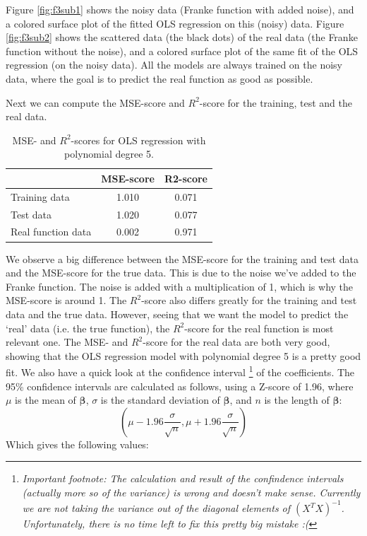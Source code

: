 \documentclass[12pt]{extarticle}
\begin{document}
Figure \ref{fig:f3sub1} shows the noisy data (Franke function with added noise), and a colored surface plot of the fitted OLS regression on this (noisy) data. Figure \ref{fig:f3sub2} shows the scattered data (the black dots) of the real data (the Franke function without the noise), and a colored surface plot of the same fit of the OLS regression (on the noisy data). All the models are always trained on the noisy data, where the goal is to predict the real function as good as possible.

Next we can compute the MSE-score and $R^2$-score for the training, test and the real data.

\begin{table}
  \begin{center}
    \caption{MSE- and $R^2$-scores for OLS regression with polynomial degree 5.}
    \label{tab:table1}
    \begin{tabular}{l|c|c} 
      \textbf{ } & \textbf{MSE-score} & \textbf{R2-score}\\
      \hline
      Training data & 1.010 & 0.071\\
      Test data & 1.020 & 0.077\\
      Real function data & 0.002 & 0.971\\
    \end{tabular}
  \end{center}
\end{table}


We observe a big difference between the MSE-score for the training and test data and the MSE-score for the true data. This is due to the noise we’ve added to the Franke function. The noise is added with a multiplication of 1, which is why the MSE-score is around 1. The $R^2$-score also differs greatly for the training and test data and the true data. However, seeing that we want the model to predict the ‘real’ data (i.e. the true function), the $R^2$-score for the real function is most relevant one. The MSE- and $R^2$-score for the real data are both very good, showing that the OLS regression model with polynomial degree 5 is a pretty good fit. We also have a quick look at the confidence interval \footnote{\textit{Important footnote: The calculation and result of the confindence intervals (actually more so of the variance) is wrong and doesn't make sense. Currently we are not taking the variance out of the diagonal elements of $(X^T X)^{-1}$. Unfortunately, there is no time left to fix this pretty big mistake :(}} of the coefficients. The 95\% confidence intervals are calculated as follows, using a Z-score of 1.96, where $\mu$ is the mean of $\bm{\beta}$, $\sigma$ is the standard deviation of $\bm{\beta}$, and $n$ is the length of $\bm{\beta}$:  
\begin{equation*}
    \left(\mu - 1.96 \frac{\sigma}{\sqrt{n}}, \mu + 1.96 \frac{\sigma}{\sqrt{n}}\right)
\end{equation*}
Which gives the following values:
\end{document}
